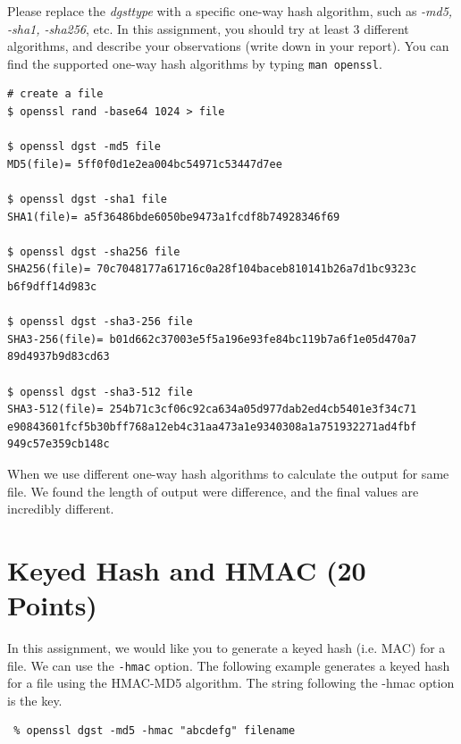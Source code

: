 \documentclass[11pt]{article}
\begin{document}
Please replace the \textit{dgsttype} with a specific one-way hash algorithm, such as \textit{-md5, -sha1, -sha256},
etc. In this assignment, you should try at least 3 different algorithms, and describe your observations (write down in your report). You can find the supported one-way hash algorithms by typing {\tt man openssl}.

\begin{small}
\begin{verbatim}
# create a file
$ openssl rand -base64 1024 > file

$ openssl dgst -md5 file
MD5(file)= 5ff0f0d1e2ea004bc54971c53447d7ee

$ openssl dgst -sha1 file
SHA1(file)= a5f36486bde6050be9473a1fcdf8b74928346f69

$ openssl dgst -sha256 file
SHA256(file)= 70c7048177a61716c0a28f104baceb810141b26a7d1bc9323c
b6f9dff14d983c

$ openssl dgst -sha3-256 file
SHA3-256(file)= b01d662c37003e5f5a196e93fe84bc119b7a6f1e05d470a7
89d4937b9d83cd63

$ openssl dgst -sha3-512 file
SHA3-512(file)= 254b71c3cf06c92ca634a05d977dab2ed4cb5401e3f34c71
e90843601fcf5b30bff768a12eb4c31aa473a1e9340308a1a751932271ad4fbf
949c57e359cb148c
\end{verbatim}
\end{small}

When we use different one-way hash algorithms to calculate the output for same file. We found the length of output were difference, and the final values are incredibly different.

\medskip

\section{Keyed Hash and HMAC (20 Points)}
In this assignment, we would like you to generate a keyed hash (i.e. MAC) for a file. We can use the {\tt -hmac} option. The following example generates a keyed hash for a file using the HMAC-MD5 algorithm. The string following the -hmac option is the key.

\begin{lstlisting}
 % openssl dgst -md5 -hmac "abcdefg" filename
\end{lstlisting}
\end{document}
